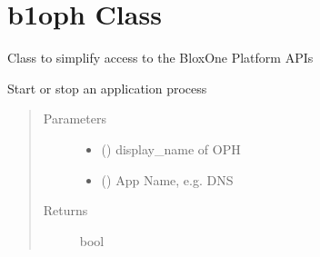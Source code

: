 \documentclass[letterpaper,10pt,english]{sphinxmanual}
\begin{document}
\section{b1oph Class}
\label{\detokenize{b1oph-class:b1oph-class}}\label{\detokenize{b1oph-class::doc}}

\begin{fulllineitems}
\label{\detokenize{b1oph-class:bloxone.b1oph}}
\sphinxAtStartPar
Class to simplify access to the BloxOne Platform APIs

\begin{fulllineitems}
\label{\detokenize{b1oph-class:bloxone.b1oph.app_process_control}}
\sphinxAtStartPar
Start or stop an application process
\begin{quote}\begin{description}
\item[{Parameters}] \leavevmode\begin{itemize}
\item {} 
\sphinxAtStartPar
{} () \textendash{} display\_name of OPH

\item {} 
\sphinxAtStartPar
{} () \textendash{} App Name, e.g. DNS

\end{itemize}

\item[{Returns}] \leavevmode
\sphinxAtStartPar
bool

\end{description}\end{quote}


\end{fulllineitems}
\end{fulllineitems}
\end{document}
